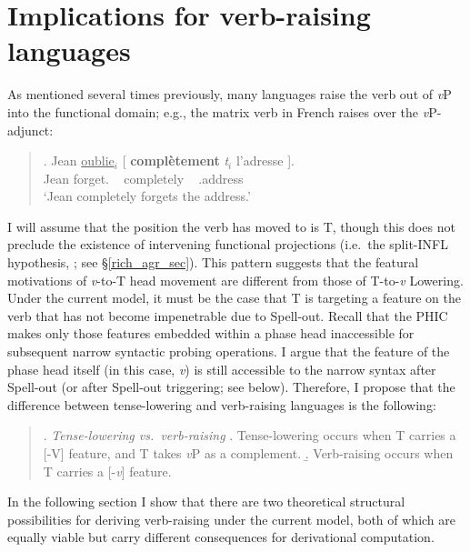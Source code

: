 \section{Implications for verb-raising languages}\label{verb-raising_sec}
As mentioned several times previously, many languages raise the verb out of {\it v}P into the functional domain; e.g., the matrix verb in French raises over the {\it v}P-adjunct:

\singlespacing
\begin{quote}
\exg. Jean \underline{oublie}$_{i}$ [ \textbf{compl\`{e}tement} {\it t}$_{i}$ l'adresse ].\\
Jean forget.\mbox{} ~ completely ~ \mbox{}.address\\
`Jean completely forgets the address.'

\end{quote}
\onehalfspacing
I will assume that the position the verb has moved to is T, though this does not preclude the existence of intervening functional projections (i.e.\ the split-INFL hypothesis, ; see \S\ref{rich_agr_sec}). This pattern suggests that the featural motivations of {\it v}-to-T head movement are different from those of T-to-{\it v} Lowering. Under the current model, it must be the case that T is targeting a feature on the verb that has not become impenetrable due to Spell-out. Recall that the PHIC makes only those features embedded within a phase head inaccessible for subsequent narrow syntactic probing operations. I argue that the feature of the phase head itself (in this case, {\it v}) is still accessible to the narrow syntax after Spell-out (or after Spell-out triggering; see below). Therefore, I propose that the difference between tense-lowering and verb-raising languages is the following:

\singlespacing
\begin{quote}
\ex. {\it Tense-lowering vs.\ verb-raising}
\a. Tense-lowering occurs when T carries a [-V] feature, and T takes {\it v}P as a complement.\footnotemark
\b. Verb-raising occurs when T carries a [-{\it v}] feature.

\end{quote}
\onehalfspacing
In the following section I show that there are two theoretical structural possibilities for deriving verb-raising under the current model, both of which are equally viable but carry different consequences for derivational computation.

